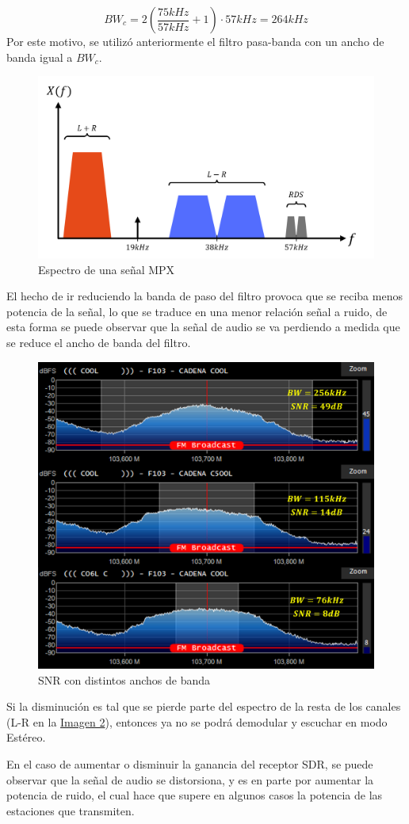 $$
BW_{c} = 2\left( \dfrac{75kHz}{57kHz}+ 1 \right) \cdot 57kHz = 264kHz
$$
Por este motivo, se utilizó anteriormente el filtro pasa-banda con un ancho de banda igual a $BW_{c}$.
\begin{figure}[H]
    \centering
    \includegraphics[width=0.8\columnwidth]{images/1.2-espectro-mpx.png}
    \caption{Espectro de una señal MPX}
    \label{fig:imagen2}
\end{figure}

El hecho de ir reduciendo la banda de paso del filtro provoca que se reciba menos potencia de la señal, lo que se traduce en una menor relación señal a ruido, de esta forma se puede observar que la señal de audio se va perdiendo a medida que se reduce el ancho de banda del filtro.

\begin{figure}[H]
    \centering
    \includegraphics[width=0.9\columnwidth]{images/1.3-mod-bw.png}
    \caption{SNR con distintos anchos de banda}
    \label{fig:imagen3}
\end{figure}

Si la disminución es tal que se pierde parte del espectro de la resta de los canales (L-R en la \hyperref[fig:imagen2]{Imagen 2}), entonces ya no se podrá demodular y escuchar en modo Estéreo.

En el caso de aumentar o disminuir la ganancia del receptor SDR, se puede observar que la señal de audio se distorsiona, y es en parte por aumentar la potencia de ruido, el cual hace que supere en algunos casos la potencia de las estaciones que transmiten.